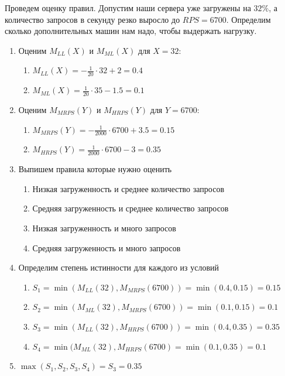 \documentclass[a4paper,12pt]{article}
\begin{document}
\noindent
Проведем оценку правил. Допустим наши сервера уже загружены на $32\%$, а количество запросов в секунду резко выросло до $RPS=6700$. Определим сколько дополнительных машин нам надо, чтобы выдержать нагрузку.
\begin{enumerate}
    \item Оценим $M_{LL}(X)$ и $M_{ML}(X)$ для $X=32$: 
        \begin{enumerate}
            \item $M_{LL}(X) = -\frac{1}{20}\cdot32+2=0.4$
            \item $M_{ML}(X) = \frac{1}{20}\cdot35-1.5=0.1$
        \end{enumerate}
    \item Оценим $M_{MRPS}(Y)$ и $M_{HRPS}(Y)$ для $Y=6700$:
        \begin{enumerate}
            \item $M_{MRPS}(Y) = -\frac{1}{2000}\cdot6700 + 3.5 = 0.15$
            \item $M_{HRPS}(Y) = \frac{1}{2000}\cdot6700 - 3 = 0.35$
        \end{enumerate}
    \item Выпишем правила которые нужно оценить
        \begin{enumerate}
            \item Низкая загруженность и среднее количество запросов
            \item Средняя загруженность и среднее количество запросов
            \item Низкая загруженность и много запросов
            \item Средняя загруженность и много запросов
        \end{enumerate}
    \item Определим степень истинности для каждого из условий
        \begin{enumerate}
            \item $S_1 = \min(M_{LL}(32),M_{MRPS}(6700))=\min(0.4,0.15)=0.15$
            \item $S_2 = \min(M_{ML}(32),M_{MRPS}(6700)) = \min(0.1,0.15) = 0.1$
            \item $S_3 = \min(M_{LL}(32),M_{HRPS}(6700)) = \min(0.4, 0.35) = 0.35$
            \item $S_4 = \min(M_{ML}(32), M_{HRPS}(6700) = \min(0.1, 0.35) = 0.1$
        \end{enumerate}
    \item $\max(S_1,S_2,S_3,S_4) = S_3 = 0.35$
\end{enumerate}
\end{document}
